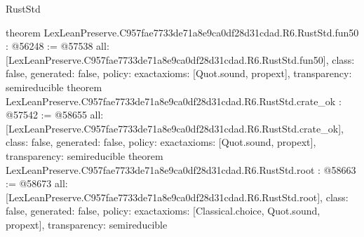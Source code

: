 \begin{lexlean}{RustStd}
\begin{coremodule}
{}
theorem LexLeanPreserve.C957fae7733de71a8e9ca0df28d31cdad.R6.RustStd.fun50 : @56248 := @57538 {
  all: [LexLeanPreserve.C957fae7733de71a8e9ca0df28d31cdad.R6.RustStd.fun50],
  class: false,
  generated: false,
  policy: exact{axioms: [Quot.sound, propext]},
  transparency: semireducible
}
theorem LexLeanPreserve.C957fae7733de71a8e9ca0df28d31cdad.R6.RustStd.crate_ok : @57542 := @58655 {
  all: [LexLeanPreserve.C957fae7733de71a8e9ca0df28d31cdad.R6.RustStd.crate_ok],
  class: false,
  generated: false,
  policy: exact{axioms: [Quot.sound, propext]},
  transparency: semireducible
}
theorem LexLeanPreserve.C957fae7733de71a8e9ca0df28d31cdad.R6.RustStd.root : @58663 := @58673 {
  all: [LexLeanPreserve.C957fae7733de71a8e9ca0df28d31cdad.R6.RustStd.root],
  class: false,
  generated: false,
  policy: exact{axioms: [Classical.choice, Quot.sound, propext]},
  transparency: semireducible
}


\end{coremodule}
\end{lexlean}
